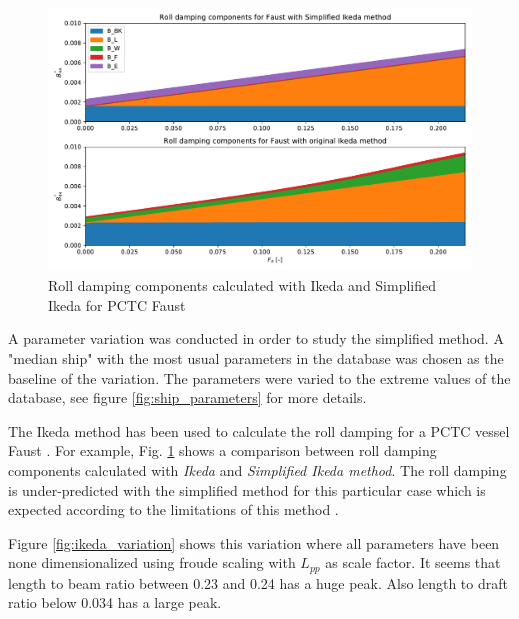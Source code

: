 \begin{figure}[h]
    \centering
    \includegraphics[height=7cm, width=14cm]{figures/ikeda_vs_simplified.pdf}
    \caption{Roll damping components calculated with Ikeda and Simplified Ikeda for PCTC Faust}
    \label{fig:ikeda_vs_simplified}
\end{figure}





A parameter variation was conducted in order to study the simplified method.
A "median ship" with the most usual parameters in the database was chosen as the baseline of the variation. The parameters were varied to the extreme values of the database, see figure \ref{fig:ship_parameters} for more details. 



The Ikeda method has been used to calculate the roll damping for a PCTC vessel Faust \parencite{soder_assessment_2019}. For example, Fig. \ref{fig:ikeda_vs_simplified} shows a comparison between roll damping components calculated with \emph{Ikeda} and \emph{Simplified Ikeda method}. The roll damping is under-predicted with the simplified method for this particular case which is expected according to the limitations of this method  \parencite{kawahara_simple_2011}.








Figure \ref{fig:ikeda_variation} shows this variation where all parameters have been none dimensionalized using froude scaling with $L_{pp}$ as scale factor. 
It seems that length to beam ratio between 0.23 and 0.24 has a huge peak. Also length to draft ratio below 0.034 has a large peak. 



